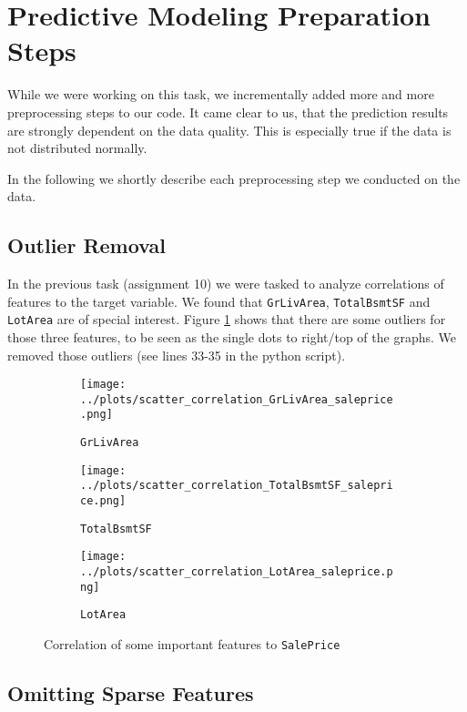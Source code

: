 \section{Predictive Modeling Preparation Steps}
\label{sec:preproc}
While we were working on this task, we incrementally added more and more preprocessing steps to our code. It came clear to us, that the prediction results are strongly dependent on the data quality. This is especially true if the data is not distributed normally.

In the following we shortly describe each preprocessing step we conducted on the data.

\subsection{Outlier Removal}

In the previous task (assignment 10) we were tasked to analyze correlations of features to the target variable. We found that \texttt{GrLivArea}, \texttt{TotalBsmtSF} and \texttt{LotArea} are of special interest. Figure \ref{fig:saleprice_corr} shows that there are some outliers for those three features, to be seen as the single dots to right/top of the graphs. We removed those outliers (see lines 33-35 in the python script).
\begin{figure}[h]
    \centering
    \begin{subfigure}{.3\textwidth}
        \texttt{[image: ../plots/scatter\_correlation\_GrLivArea\_saleprice.png]}
        \caption{\texttt{GrLivArea}}
    \end{subfigure}
    \begin{subfigure}{.3\textwidth}
        \texttt{[image: ../plots/scatter\_correlation\_TotalBsmtSF\_saleprice.png]}
        \caption{\texttt{TotalBsmtSF}}
    \end{subfigure}
    \begin{subfigure}{.3\textwidth}
        \texttt{[image: ../plots/scatter\_correlation\_LotArea\_saleprice.png]}
        \caption{\texttt{LotArea}}
    \end{subfigure}
    \caption{Correlation of some important features to \texttt{SalePrice}}
    \label{fig:saleprice_corr}
\end{figure}

\subsection{Omitting Sparse Features}

